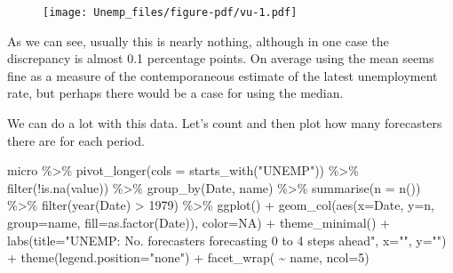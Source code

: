 \documentclass[
  letterpaper,
]{book}
\newenvironment{Shaded}{\begin{snugshade}}{\end{snugshade}}
\newcommand{\AttributeTok}[1]{\textcolor[rgb]{0.40,0.45,0.13}{#1}}
\newcommand{\ConstantTok}[1]{\textcolor[rgb]{0.56,0.35,0.01}{#1}}
\newcommand{\DecValTok}[1]{\textcolor[rgb]{0.68,0.00,0.00}{#1}}
\newcommand{\FunctionTok}[1]{\textcolor[rgb]{0.28,0.35,0.67}{#1}}
\newcommand{\NormalTok}[1]{\textcolor[rgb]{0.00,0.23,0.31}{#1}}
\newcommand{\SpecialCharTok}[1]{\textcolor[rgb]{0.37,0.37,0.37}{#1}}
\newcommand{\StringTok}[1]{\textcolor[rgb]{0.13,0.47,0.30}{#1}}
\begin{document}
\begin{figure}[H]

{\centering \texttt{[image: Unemp\_files/figure-pdf/vu-1.pdf]}

}

\end{figure}

As we can see, usually this is nearly nothing, although in one case the
discrepancy is almost 0.1 percentage points. On average using the mean
seems fine as a measure of the contemporaneous estimate of the latest
unemployment rate, but perhaps there would be a case for using the
median.

We can do a lot with this data. Let's count and then plot how many
forecasters there are for each period.

\begin{Shaded}
\begin{Highlighting}[]
\NormalTok{micro }\SpecialCharTok{\%\textgreater{}\%} 
  \FunctionTok{pivot\_longer}\NormalTok{(}\AttributeTok{cols =} \FunctionTok{starts\_with}\NormalTok{(}\StringTok{"UNEMP"}\NormalTok{)) }\SpecialCharTok{\%\textgreater{}\%} 
  \FunctionTok{filter}\NormalTok{(}\SpecialCharTok{!}\FunctionTok{is.na}\NormalTok{(value)) }\SpecialCharTok{\%\textgreater{}\%} 
  \FunctionTok{group\_by}\NormalTok{(Date, name) }\SpecialCharTok{\%\textgreater{}\%} 
  \FunctionTok{summarise}\NormalTok{(}\AttributeTok{n =} \FunctionTok{n}\NormalTok{()) }\SpecialCharTok{\%\textgreater{}\%}
  \FunctionTok{filter}\NormalTok{(}\FunctionTok{year}\NormalTok{(Date) }\SpecialCharTok{\textgreater{}} \DecValTok{1979}\NormalTok{) }\SpecialCharTok{\%\textgreater{}\%} 
  \FunctionTok{ggplot}\NormalTok{() }\SpecialCharTok{+} 
  \FunctionTok{geom\_col}\NormalTok{(}\FunctionTok{aes}\NormalTok{(}\AttributeTok{x=}\NormalTok{Date, }\AttributeTok{y=}\NormalTok{n, }\AttributeTok{group=}\NormalTok{name, }\AttributeTok{fill=}\FunctionTok{as.factor}\NormalTok{(Date)), }\AttributeTok{color=}\ConstantTok{NA}\NormalTok{) }\SpecialCharTok{+}
  \FunctionTok{theme\_minimal}\NormalTok{() }\SpecialCharTok{+}
  \FunctionTok{labs}\NormalTok{(}\AttributeTok{title=}\StringTok{"UNEMP: No. forecasters forecasting 0 to 4 steps ahead"}\NormalTok{, }\AttributeTok{x=}\StringTok{""}\NormalTok{, }\AttributeTok{y=}\StringTok{""}\NormalTok{) }\SpecialCharTok{+}
  \FunctionTok{theme}\NormalTok{(}\AttributeTok{legend.position=}\StringTok{"none"}\NormalTok{) }\SpecialCharTok{+}
  \FunctionTok{facet\_wrap}\NormalTok{( }\SpecialCharTok{\textasciitilde{}}\NormalTok{ name, }\AttributeTok{ncol=}\DecValTok{5}\NormalTok{)}
\end{Highlighting}
\end{Shaded}
\end{document}
